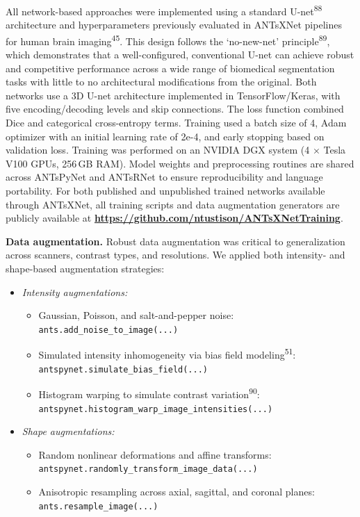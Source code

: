 \documentclass[
  12pt,
]{article}
\providecommand{\tightlist}{%
  \setlength{\itemsep}{0pt}\setlength{\parskip}{0pt}}
\begin{document}
All network-based approaches were implemented using a standard
U-net\textsuperscript{88} architecture and hyperparameters previously
evaluated in ANTsXNet pipelines for human brain
imaging\textsuperscript{45}. This design follows the `no-new-net'
principle\textsuperscript{89}, which demonstrates that a
well-configured, conventional U-net can achieve robust and competitive
performance across a wide range of biomedical segmentation tasks with
little to no architectural modifications from the original. Both
networks use a 3D U-net architecture implemented in TensorFlow/Keras,
with five encoding/decoding levels and skip connections. The loss
function combined Dice and categorical cross-entropy terms. Training
used a batch size of 4, Adam optimizer with an initial learning rate of
2e-4, and early stopping based on validation loss. Training was
performed on an NVIDIA DGX system (4 \(\times\) Tesla V100 GPUs, 256\,GB
RAM). Model weights and preprocessing routines are shared across
ANTsPyNet and ANTsRNet to ensure reproducibility and language
portability. For both published and unpublished trained networks
available through ANTsXNet, all training scripts and data augmentation
generators are publicly available at
\textbf{\url{https://github.com/ntustison/ANTsXNetTraining}}.

\textbf{Data augmentation.} Robust data augmentation was critical to
generalization across scanners, contrast types, and resolutions. We
applied both intensity- and shape-based augmentation strategies:

\begin{itemize}
\item
  \emph{Intensity augmentations:}

  \begin{itemize}
  \tightlist
  \item
    Gaussian, Poisson, and salt-and-pepper noise:\\
    \texttt{ants.add\_noise\_to\_image(...)}
  \item
    Simulated intensity inhomogeneity via bias field
    modeling\textsuperscript{51}:\\
    \texttt{antspynet.simulate\_bias\_field(...)}
  \item
    Histogram warping to simulate contrast
    variation\textsuperscript{90}:\\
    \texttt{antspynet.histogram\_warp\_image\_intensities(...)}
  \end{itemize}
\item
  \emph{Shape augmentations:}

  \begin{itemize}
  \tightlist
  \item
    Random nonlinear deformations and affine transforms:\\
    \texttt{antspynet.randomly\_transform\_image\_data(...)}
  \item
    Anisotropic resampling across axial, sagittal, and coronal planes:\\
    \texttt{ants.resample\_image(...)}
  \end{itemize}
\end{itemize}
\end{document}
